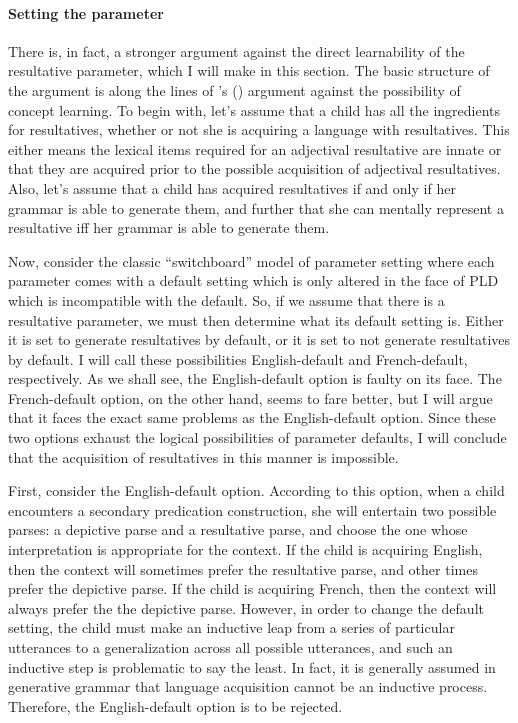 \documentclass[MilwayThesis]{subfiles}
\begin{document}
\paragraph{Setting the parameter}
There is, in fact, a stronger argument against the direct learnability of the resultative parameter, which I will make in this section.
The basic structure of the argument is along the lines of \citeauthor{fodor1975language}'s (\citeyear{fodor1975language}) argument against the possibility of concept learning.
To begin with, let's assume that a child has all the ingredients for resultatives, whether or not she is acquiring a language with resultatives.
This either means the lexical items required for an adjectival resultative are innate or that they are acquired prior to the possible acquisition of adjectival resultatives.
Also, let's assume that a child has acquired resultatives if and only if her grammar is able to generate them, and further that she can mentally represent a resultative iff her grammar is able to generate them.

Now, consider the classic ``switchboard'' model of parameter setting where each parameter comes with a default setting which is only altered in the face of PLD which is incompatible with the default.
So, if we assume that there is a resultative parameter, we must then determine what its default setting is.
Either it is set to generate resultatives by default, or it is set to not generate resultatives by default.
I will call these possibilities English-default and French-default, respectively.
As we shall see, the English-default option is faulty on its face.
The French-default option, on the other hand, seems to fare better, but I will argue that it faces the exact same problems as the English-default option.
Since these two options exhaust the logical possibilities of parameter defaults, I will conclude that the acquisition of resultatives in this manner is impossible.

First, consider the English-default option.
According to this option, when a child encounters a secondary predication construction, she will entertain two possible parses: a depictive parse and a resultative parse, and choose the one whose interpretation is appropriate for the context.
If the child is acquiring English, then the context will sometimes prefer the resultative parse, and other times prefer the depictive parse.
If the child is acquiring French, then the context will always prefer the the depictive parse.
However, in order to change the default setting, the child must make an inductive leap from a series of particular utterances to a generalization across all possible utterances, and such an inductive step is problematic to say the least.
In fact, it is generally assumed in generative grammar that language acquisition cannot be an inductive process.
Therefore, the English-default option is to be rejected.
\end{document}
